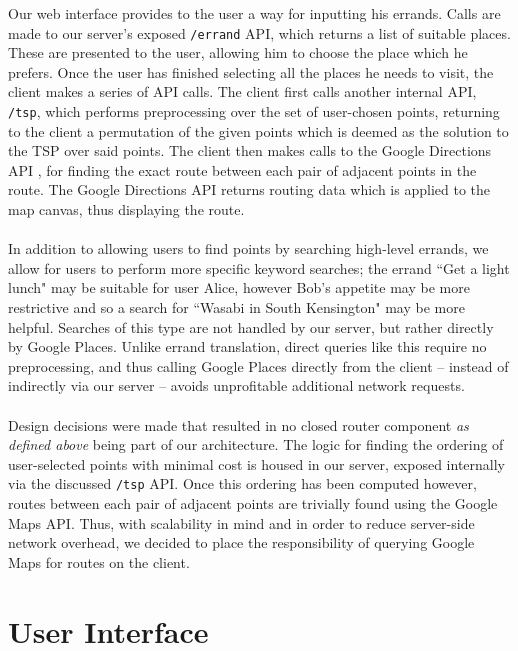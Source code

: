 \documentclass[a4paper, 10pt]{report}
\begin{document}
Our web interface provides to the user a way for inputting his errands. Calls are made to our server’s exposed \texttt{/errand} API, which returns a list of suitable places. These are presented to the user, allowing him to choose the place which he prefers. Once the user has finished selecting all the places he needs to visit, the client makes a series of API calls. The client first calls another internal API, \texttt{/tsp}, which performs preprocessing over the set of user-chosen points, returning to the client a permutation of the given points which is deemed as the solution to the TSP over said points. The client then makes calls to the Google Directions API \cite{google-directions}, for finding the exact route between each pair of adjacent points in the route. The Google Directions API returns routing data which is applied to the map canvas, thus displaying the route. \\\\
In addition to allowing users to find points by searching high-level errands, we allow for users to perform more specific keyword searches; the errand ``Get a light lunch" may be suitable for user Alice, however Bob’s appetite may be more restrictive and so a search for ``Wasabi in South Kensington" may be more helpful. Searches of this type are not handled by our server, but rather directly by Google Places. Unlike errand translation, direct queries like this require no preprocessing, and thus calling Google Places directly from the client -- instead of indirectly via our server -- avoids unprofitable additional network requests. \\\\
Design decisions were made that resulted in no closed router component \textit{as defined above} being part of our architecture. The logic for finding the ordering of user-selected points with minimal cost is housed in our server, exposed internally via the discussed \texttt{/tsp} API. Once this ordering has been computed however, routes between each pair of adjacent points are trivially found using the Google Maps API. Thus, with scalability in mind and in order to reduce server-side network overhead, we decided to place the responsibility of querying Google Maps for routes on the client.
\section{User Interface}
\end{document}
